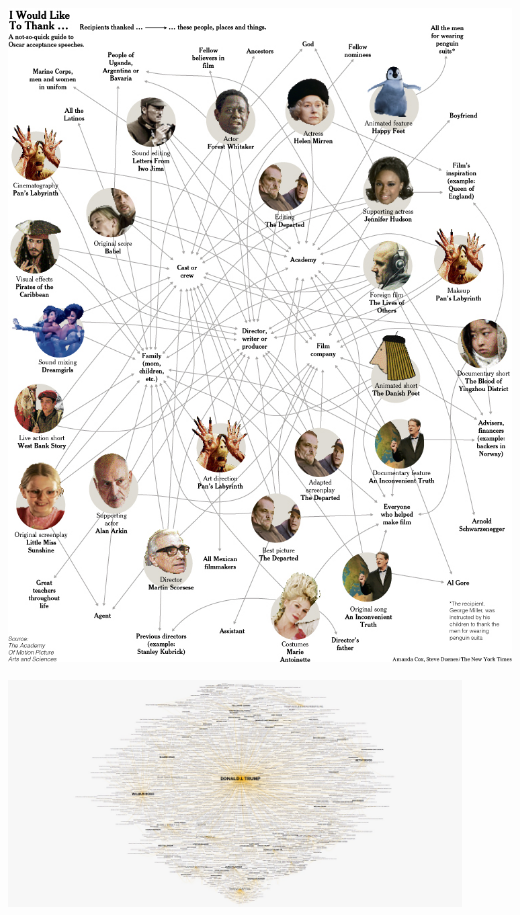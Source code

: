 \documentclass[aspectratio=169]{beamer}
\begin{document}
\begin{frame}

\begin{center}
\includegraphics[height=0.9\textheight]{figures/nytimes_oscar_2007}
\end{center}

\vfill
{}

\end{frame}
\begin{frame}

\begin{center}
\includegraphics[width=0.9\textwidth]{figures/trump_network}
\end{center}

\vfill
{}

\end{frame}
\end{document}
